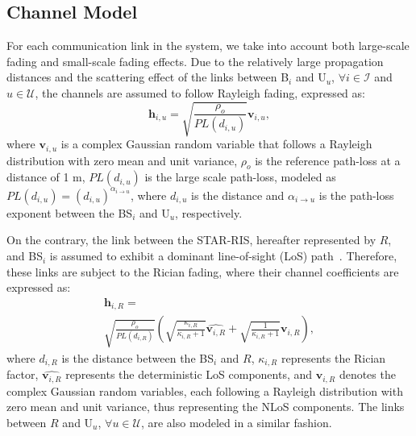 \documentclass[conference]{IEEEtran}
\begin{document}
\subsection{Channel Model}
For each communication link in the system, we take into account both large-scale fading and small-scale fading effects. Due to the relatively large propagation distances and the scattering effect of the links between B$_i$ and U$_u$, $\forall i \in \mathcal{I}$ and $u \in \mathcal{U}$, the channels are assumed to follow Rayleigh fading, expressed as:
\begin{equation}
    \textbf{h}_{i,u} = \sqrt{\frac{\rho_{o}}{PL(d_{i,u})}} \mathbf{v}_{i,u},
\end{equation}
where $\mathbf{v}_{i,u}$ is a complex Gaussian random variable that follows a Rayleigh distribution with zero mean and unit variance, $\rho_{o}$ is the reference path-loss at a distance of 1 m, $PL(d_{i,u})$ is the large scale path-loss, modeled as $PL(d_{i,u})=\left(d_{i,u}\right)^{\alpha_{i\rightarrow u}}$, where $d_{i, u}$ is the distance and $\alpha_{i\rightarrow u}$ is the path-loss exponent between the BS$_i$ and U$_u$, respectively.

On the contrary, the link between the STAR-RIS, hereafter represented by $R$, and BS$_i$ is assumed to exhibit a dominant line-of-sight (LoS) path~\cite{guo2020intelligent}. Therefore, these links are subject to the Rician fading, where their channel coefficients are expressed as:
\begin{multline}
    \textbf{h}_{i,R} = \\
    \sqrt{\frac{\rho_{o}}{PL(d_{i,R})}} \left( \sqrt{\frac{\kappa_{i,R}}{\kappa_{i,R} + 1}} \hat{\mathbf{v}_{i,R}} + \sqrt{\frac{1}{\kappa_{i,R} + 1}} \mathbf{v}_{i,R} \right),
\end{multline}
where $d_{i,R}$ is the distance between the BS$_i$ and $R$, $\kappa_{i,R}$ represents the Rician factor, $\hat{\mathbf{v}_{i,R}}$ represents the deterministic LoS components, and $\mathbf{v}_{i,R}$ denotes the complex Gaussian random variables, each following a Rayleigh distribution with zero mean and unit variance, thus representing the NLoS components. The links between $R$ and U$_u$, $\forall u \in \mathcal{U}$, are also modeled in a similar fashion.
\end{document}

